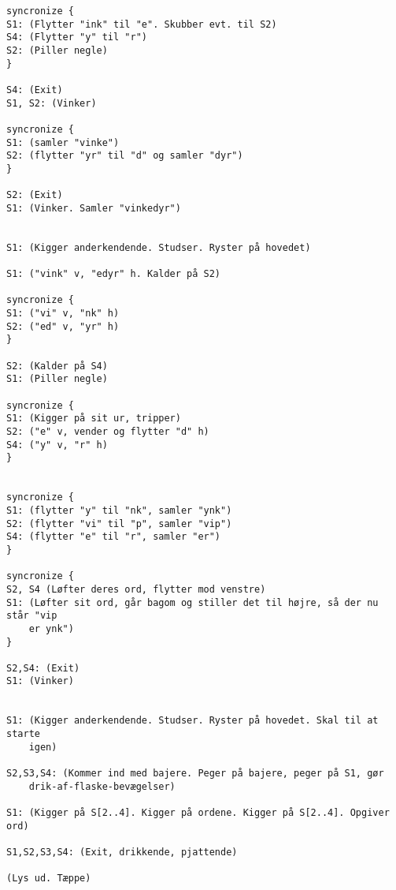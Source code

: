 \documentclass[danish]{article}
\begin{document}
\begin{sketch}
\begin{verbatim}
syncronize {
S1: (Flytter "ink" til "e". Skubber evt. til S2)
S4: (Flytter "y" til "r")
S2: (Piller negle)
}

S4: (Exit)
S1, S2: (Vinker)

syncronize {
S1: (samler "vinke")
S2: (flytter "yr" til "d" og samler "dyr")
}

S2: (Exit)
S1: (Vinker. Samler "vinkedyr")


S1: (Kigger anderkendende. Studser. Ryster på hovedet)

S1: ("vink" v, "edyr" h. Kalder på S2)

syncronize {
S1: ("vi" v, "nk" h)
S2: ("ed" v, "yr" h)
}

S2: (Kalder på S4)
S1: (Piller negle)

syncronize {
S1: (Kigger på sit ur, tripper)
S2: ("e" v, vender og flytter "d" h)
S4: ("y" v, "r" h)
}


syncronize {
S1: (flytter "y" til "nk", samler "ynk")
S2: (flytter "vi" til "p", samler "vip")
S4: (flytter "e" til "r", samler "er")
}

syncronize {
S2, S4 (Løfter deres ord, flytter mod venstre)
S1: (Løfter sit ord, går bagom og stiller det til højre, så der nu står "vip
    er ynk")
}

S2,S4: (Exit)
S1: (Vinker)


S1: (Kigger anderkendende. Studser. Ryster på hovedet. Skal til at starte
    igen)

S2,S3,S4: (Kommer ind med bajere. Peger på bajere, peger på S1, gør
    drik-af-flaske-bevægelser)

S1: (Kigger på S[2..4]. Kigger på ordene. Kigger på S[2..4]. Opgiver ord)

S1,S2,S3,S4: (Exit, drikkende, pjattende)

(Lys ud. Tæppe)

\end{verbatim}

\end{sketch}
\end{document}

